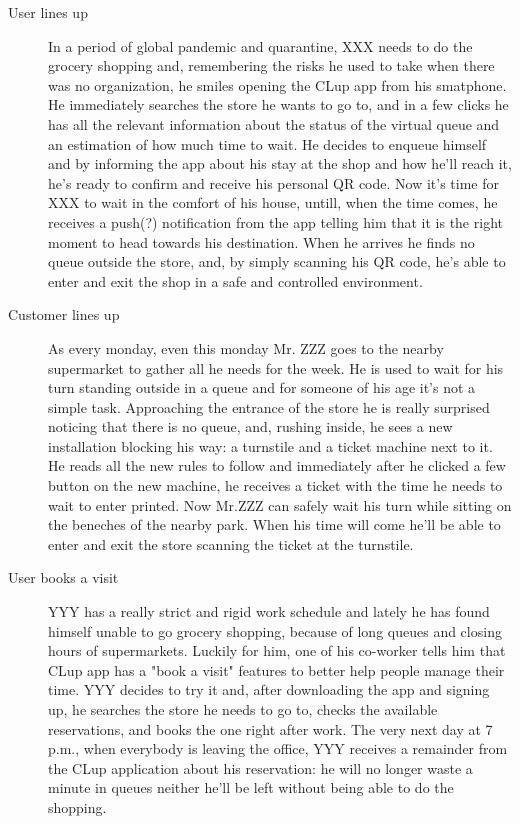 \begin{description}
    \item[User lines up] 
    In a period of global pandemic and quarantine, XXX needs to do the grocery shopping and, remembering the risks he used to take when there was no organization, he smiles opening the CLup app from his smatphone. He immediately searches the store he wants to go to, and in a few clicks he has all the relevant information about the status of the virtual queue and an estimation of how much time to wait. He decides to enqueue himself and by informing the app about his stay at the shop and how he'll reach it, he's ready to confirm and receive his personal QR code. Now it's time for XXX to wait in the comfort of his house, untill, when the time comes, he receives a push(?) notification from the app telling him that it is the right moment to head towards his destination. When he arrives he finds no queue outside the store, and, by simply scanning his QR code, he's able to enter and exit the shop in a safe and controlled environment.

    \item[Customer lines up]
    As every monday, even this monday Mr. ZZZ goes to the nearby supermarket to gather all he needs for the week. He is used to wait for his turn standing outside in a queue and for someone of his age it's not a simple task. Approaching the entrance of the store he is really surprised noticing that there is no queue, and, rushing inside, he sees a new installation blocking his way: a turnstile and a ticket machine next to it. He reads all the new rules to follow and immediately after he clicked a few button on the new machine, he receives a ticket with the time he needs to wait to enter printed. Now Mr.ZZZ can safely wait his turn while sitting on the beneches of the nearby park. When his time will come he'll be able to enter and exit the store scanning the ticket at the turnstile.

    \item[User books a visit]
    YYY has a really strict and rigid work schedule and lately he has found himself unable to go grocery shopping, because of long queues and closing hours of supermarkets. Luckily for him, one of his co-worker tells him that CLup app has a "book a visit" features to better help people manage their time. YYY decides to try it and, after downloading the app and signing up, he searches the store he needs to go to, checks the available reservations, and books the one right after work. The very next day at 7 p.m., when everybody is leaving the office, YYY receives a remainder from the CLup application about his reservation: he will no longer waste a minute in queues neither he'll be left without being able to do the shopping.


\end{description}
